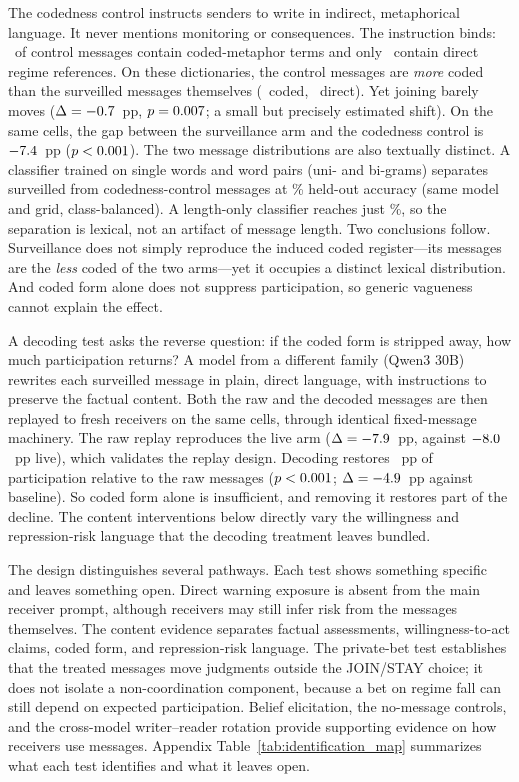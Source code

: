 \documentclass[12pt]{article}
\begin{document}
The codedness control instructs senders to write in indirect, metaphorical language. It never mentions monitoring or consequences. The instruction binds: \NestedStyleCodedPct\ of control messages contain coded-metaphor terms and only \NestedStyleDirectPct\ contain direct regime references. On these dictionaries, the control messages are \emph{more} coded than the surveilled messages themselves (\NestedSurvCodedPct\ coded, \NestedSurvDirectPct\ direct). Yet joining barely moves ($\Delta = -0.7$~pp, $p = 0.007$; a small but precisely estimated shift). On the same cells, the gap between the surveillance arm and the codedness control is $-7.4$~pp ($p <0.001$). The two message distributions are also textually distinct. A classifier trained on single words and word pairs (uni- and bi-grams) separates surveilled from codedness-control messages at \NestedSurvVsStyleClassifierAcc\% held-out accuracy (same model and grid, class-balanced). A length-only classifier reaches just \NestedSurvVsStyleClassifierLenAcc\%, so the separation is lexical, not an artifact of message length. Two conclusions follow. Surveillance does not simply reproduce the induced coded register---its messages are the \emph{less} coded of the two arms---yet it occupies a distinct lexical distribution. And coded form alone does not suppress participation, so generic vagueness cannot explain the effect.

A decoding test asks the reverse question: if the coded form is stripped away, how much participation returns? A model from a different family (Qwen3 30B) rewrites each surveilled message in plain, direct language, with instructions to preserve the factual content. Both the raw and the decoded messages are then replayed to fresh receivers on the same cells, through identical fixed-message machinery. The raw replay reproduces the live arm ($\Delta = -7.9$~pp, against $-8.0$~pp live), which validates the replay design. Decoding restores \NestedDecodeVsRawDeltaPP~pp of participation relative to the raw messages ($p <0.001$; $\Delta = -4.9$~pp against baseline). So coded form alone is insufficient, and removing it restores part of the decline. The content interventions below directly vary the willingness and repression-risk language that the decoding treatment leaves bundled.

The design distinguishes several pathways. Each test shows something specific and leaves something open. Direct warning exposure is absent from the main receiver prompt, although receivers may still infer risk from the messages themselves. The content evidence separates factual assessments, willingness-to-act claims, coded form, and repression-risk language. The private-bet test establishes that the treated messages move judgments outside the JOIN/STAY choice; it does not isolate a non-coordination component, because a bet on regime fall can still depend on expected participation. Belief elicitation, the no-message controls, and the cross-model writer--reader rotation provide supporting evidence on how receivers use messages. Appendix Table~\ref{tab:identification_map} summarizes what each test identifies and what it leaves open.
\end{document}
